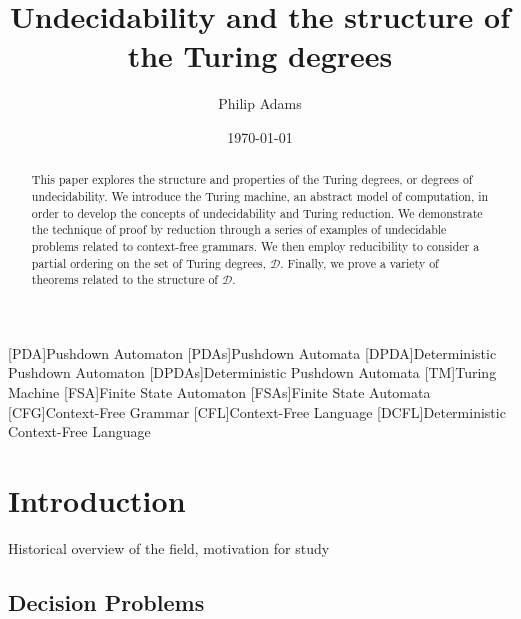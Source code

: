 \documentclass[psamsfonts]{amsart}
\title{Undecidability and the structure of the Turing degrees}
\author{Philip Adams}
\date{\today}
\theoremstyle{definition}
\theoremstyle{remark}
\numberwithin{equation}{section}
\begin{document}
\begin{abstract}

  This paper explores the structure and properties of the Turing degrees, or
  degrees of undecidability. We introduce the Turing machine, an abstract model
  of computation, in order to develop the concepts of undecidability and Turing
  reduction. We demonstrate the technique of proof by reduction through a series
  of examples of undecidable problems related to context-free grammars. We then
  employ reducibility to consider a partial ordering on the set of Turing degrees, $\mathcal{D}$. Finally, we prove a variety of theorems
  related to the structure of $\mathcal{D}$.
  
\end{abstract}

\maketitle


\tableofcontents
\begin{acronym}
  [PDA]{Pushdown Automaton}
  [PDAs]{Pushdown Automata}
  [DPDA]{Deterministic Pushdown Automaton}
  [DPDAs]{Deterministic Pushdown Automata}
  [TM]{Turing Machine}
  [FSA]{Finite State Automaton}
  [FSAs]{Finite State Automata}
  [CFG]{Context-Free Grammar}
  [CFL]{Context-Free Language}
  [DCFL]{Deterministic Context-Free Language}
\end{acronym}

\section{Introduction}
Historical overview of the field, motivation for study
\cite{ambos-spies06:_degrees_unsol}
\cite{soare16_turin_comput}
\cite{soare1999history}
\cite{lerman16:_degrees_unsol}
\todo{}
\subsection{Decision Problems}
\end{document}
